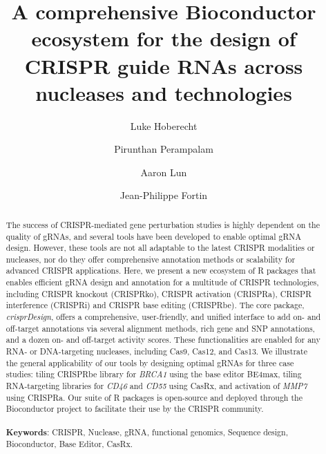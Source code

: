 \documentclass[pdftex,english,10pt]{article}
\begin{document}
\renewcommand\Affilfont{\small}


\title{A comprehensive Bioconductor ecosystem for the design of CRISPR guide RNAs across nucleases and technologies}
\author[1]{Luke Hoberecht}
\author[2]{Pirunthan Perampalam}
\author[1]{Aaron Lun}
\author[1,*]{Jean-Philippe Fortin}
\date{}






\let\oldthefootnote\thefootnote
\renewcommand{\thefootnote}{\fnsymbol{footnote}}
\let\thefootnote\oldthefootnote



\maketitle
\
\begin{abstract}
\noindent 
The success of CRISPR-mediated gene perturbation studies is highly dependent on the quality of gRNAs, and several tools have been developed to enable optimal gRNA design. 
However, these tools are not all adaptable to the latest CRISPR modalities or nucleases, nor do they offer comprehensive annotation methods or scalability for advanced CRISPR applications. 
Here, we present a new ecosystem of R packages that enables efficient gRNA design and annotation for a multitude of CRISPR technologies, including CRISPR knockout (CRISPRko), CRISPR activation (CRISPRa), CRISPR interference (CRISPRi) and CRISPR base editing (CRISPRbe). 
The core package, \textit{crisprDesign}, offers a comprehensive, user-friendly, and unified interface to add on- and off-target annotations via several alignment methods, rich gene and SNP annotations, and a dozen on- and off-target activity scores. These functionalities are enabled for any RNA- or DNA-targeting nucleases, including Cas9, Cas12, and Cas13. 
We illustrate the general applicability of our tools by designing optimal gRNAs for three case studies: tiling CRISPRbe library for \textit{BRCA1} using the base editor BE4max, tiling RNA-targeting libraries for \textit{CD46} and \textit{CD55} using CasRx, and activation of \textit{MMP7} using CRISPRa. 
Our suite of R packages is open-source and deployed through the Bioconductor project to facilitate their use by the CRISPR community.
\\
\\
\textbf{Keywords}: CRISPR, Nuclease, gRNA, functional genomics, Sequence design, Bioconductor, Base Editor, CasRx.
 \end{abstract}
\end{document}
